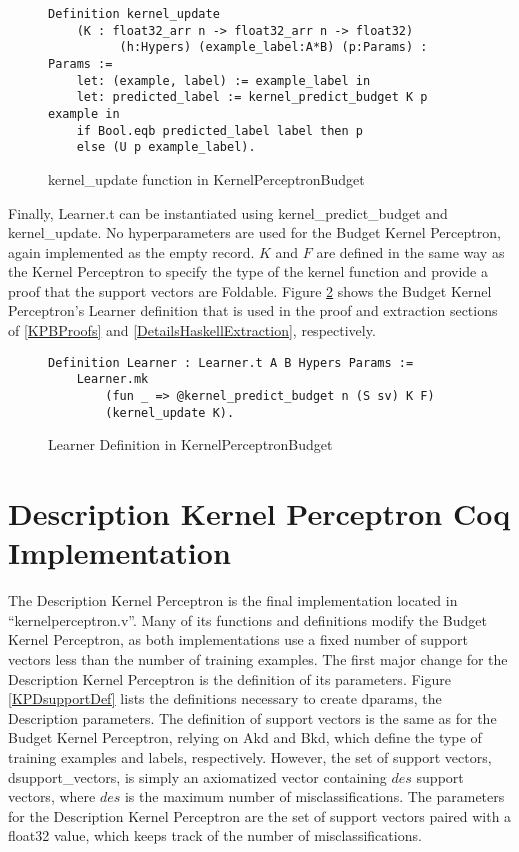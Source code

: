 \begin{figure}
    \caption{kernel\_update function in KernelPerceptronBudget}
    \label{kernel_update_budgetDef}
    \begin{lstlisting}
Definition kernel_update 
    (K : float32_arr n -> float32_arr n -> float32)
          (h:Hypers) (example_label:A*B) (p:Params) : Params :=
    let: (example, label) := example_label in 
    let: predicted_label := kernel_predict_budget K p example in
    if Bool.eqb predicted_label label then p
    else (U p example_label).
    \end{lstlisting}
\end{figure}

Finally, Learner.t can be instantiated using kernel\_predict\_budget and kernel\_update. No hyperparameters are used for the Budget Kernel Perceptron, again implemented as the empty record. $K$ and $F$ are defined in the same way as the Kernel Perceptron to specify the type of the kernel function and provide a proof that the support vectors are Foldable. Figure \ref{kpbLearnerDef} shows the Budget Kernel Perceptron's Learner definition that is used in the proof and extraction sections of \ref{KPBProofs} and \ref{DetailsHaskellExtraction}, respectively.

\begin{figure}
    \caption{Learner Definition in KernelPerceptronBudget}
    \label{kpbLearnerDef}
    \begin{lstlisting}
Definition Learner : Learner.t A B Hypers Params :=
    Learner.mk
        (fun _ => @kernel_predict_budget n (S sv) K F)
        (kernel_update K).
    \end{lstlisting}
\end{figure}

\section{Description Kernel Perceptron Coq Implementation}\label{KPDCoqImp}

The Description Kernel Perceptron is the final implementation located in ``kernelperceptron.v''. Many of its functions and definitions modify the Budget Kernel Perceptron, as both implementations use a fixed number of support vectors less than the number of training examples. The first major change for the Description Kernel Perceptron is the definition of its parameters. Figure \ref{KPDsupportDef} lists the definitions necessary to create dparams, the Description parameters. The definition of support vectors is the same as for the Budget Kernel Perceptron, relying on Akd and Bkd, which define the type of training examples and labels, respectively. However, the set of support vectors, dsupport\_vectors, is simply an axiomatized vector containing $des$ support vectors, where $des$ is the maximum number of misclassifications. The parameters for the Description Kernel Perceptron are the set of support vectors paired with a float32 value, which keeps track of the number of misclassifications.

